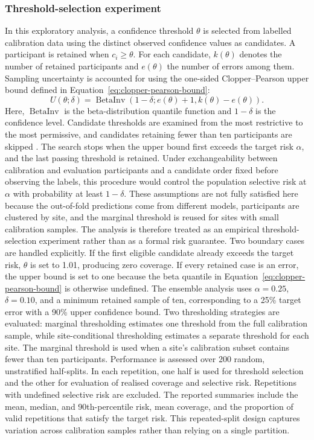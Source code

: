 \documentclass[a4paper,fleqn]{cas-sc}
\begin{document}
\subsubsection*{Threshold-selection experiment}
In this exploratory analysis, a confidence threshold $\theta$ is selected from labelled calibration data using the distinct observed confidence values as candidates. A participant is retained when $c_i\geq\theta$. For each candidate, $k(\theta)$ denotes the number of retained participants and $e(\theta)$ the number of errors among them. Sampling uncertainty is accounted for using the one-sided Clopper--Pearson upper bound defined in Equation~\eqref{eq:clopper-pearson-bound}:
\begin{equation}
U(\theta;\delta)
=
\operatorname{BetaInv}
\left(
1-\delta;
e(\theta)+1,
k(\theta)-e(\theta)
\right).
\label{eq:clopper-pearson-bound}
\end{equation}
Here, $\operatorname{BetaInv}$ is the beta-distribution quantile function and $1-\delta$ is the confidence level. Candidate thresholds are examined from the most restrictive to the most permissive, and candidates retaining fewer than ten participants are skipped \citep{Angelopoulosetal2021,AngelopoulosBates2023}. The search stops when the upper bound first exceeds the target risk $\alpha$, and the last passing threshold is retained. Under exchangeability between calibration and evaluation participants and a candidate order fixed before observing the labels, this procedure would control the population selective risk at $\alpha$ with probability at least $1-\delta$. These assumptions are not fully satisfied here because the out-of-fold predictions come from different models, participants are clustered by site, and the marginal threshold is reused for sites with small calibration samples. The analysis is therefore treated as an empirical threshold-selection experiment rather than as a formal risk guarantee. Two boundary cases are handled explicitly. If the first eligible candidate already exceeds the target risk, $\theta$ is set to 1.01, producing zero coverage. If every retained case is an error, the upper bound is set to one because the beta quantile in Equation~\eqref{eq:clopper-pearson-bound} is otherwise undefined. The ensemble analysis uses $\alpha=0.25$, $\delta=0.10$, and a minimum retained sample of ten, corresponding to a 25\% target error with a 90\% upper confidence bound. Two thresholding strategies are evaluated: marginal thresholding estimates one threshold from the full calibration sample, while site-conditional thresholding estimates a separate threshold for each site. The marginal threshold is used when a site's calibration subset contains fewer than ten participants. Performance is assessed over 200 random, unstratified half-splits. In each repetition, one half is used for threshold selection and the other for evaluation of realised coverage and selective risk. Repetitions with undefined selective risk are excluded. The reported summaries include the mean, median, and 90th-percentile risk, mean coverage, and the proportion of valid repetitions that satisfy the target risk. This repeated-split design captures variation across calibration samples rather than relying on a single partition.
\end{document}

